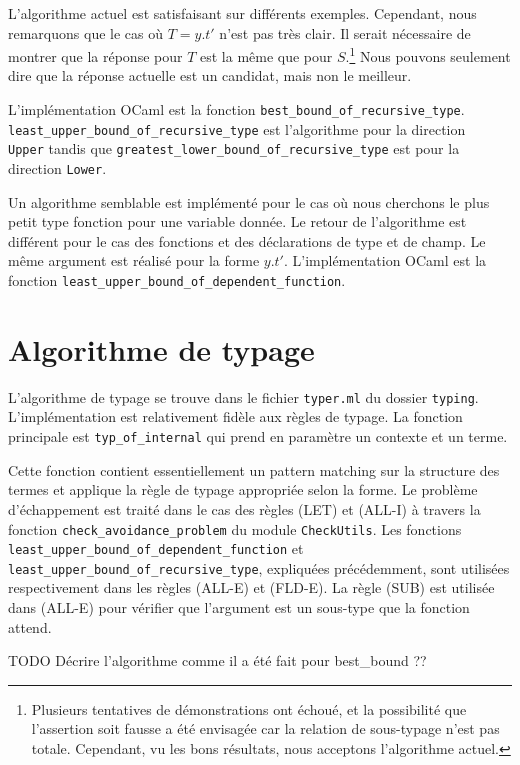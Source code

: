 L'algorithme actuel est satisfaisant sur différents exemples. Cependant, nous
remarquons que le cas où $T = y.t'$ n'est pas très clair. Il serait nécessaire de
montrer que la réponse pour $T$ est la même que pour $S$.\footnote{Plusieurs
tentatives de démonstrations ont échoué, et la possibilité que l'assertion soit
fausse a été envisagée car la relation de sous-typage n'est pas totale.
Cependant, vu les bons résultats, nous acceptons l'algorithme actuel.} Nous
pouvons seulement dire que la réponse actuelle est un candidat, mais non le
meilleur.

L'implémentation OCaml est la fonction \verb|best_bound_of_recursive_type|.
\verb|least_upper_bound_of_recursive_type| est l'algorithme pour la direction \\
\verb|Upper| tandis que \verb|greatest_lower_bound_of_recursive_type| est pour
la direction \verb|Lower|.

Un algorithme semblable est implémenté pour le cas où nous cherchons le plus
petit type fonction pour une variable donnée. Le retour de l'algorithme est
différent pour le cas des fonctions et des déclarations de type et de champ. Le
même argument est réalisé pour la forme $y.t'$.
L'implémentation OCaml est la fonction \verb|least_upper_bound_of_dependent_function|.

\section{Algorithme de typage}

L'algorithme de typage se trouve dans le fichier \verb|typer.ml| du dossier \verb|typing|.
L'implémentation est relativement fidèle aux règles de typage.
La fonction principale est \verb|typ_of_internal| qui prend en paramètre un
contexte et un terme. 

Cette fonction contient essentiellement un pattern matching sur la structure des
termes et applique la règle de typage appropriée selon la forme. Le problème
d'échappement est traité dans le cas des règles (LET) et (ALL-I) à travers la
fonction \verb|check_avoidance_problem| du module \verb|CheckUtils|. Les
fonctions \verb|least_upper_bound_of_dependent_function| et \\
\verb|least_upper_bound_of_recursive_type|, expliquées précédemment, sont
utilisées respectivement dans les règles (ALL-E) et (FLD-E). La règle (SUB) est
utilisée dans (ALL-E) pour vérifier que l'argument est un sous-type que la
fonction attend.

TODO Décrire l'algorithme comme il a été fait pour best\_bound ??

